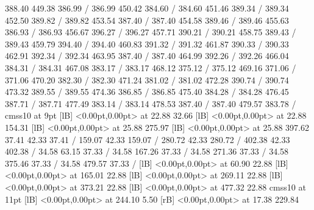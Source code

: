 { 388.40 449.38 386.99 /
 386.99 450.42 384.60 /
 384.60 451.46 389.34 /
 389.34 452.50 389.82 /
 389.82 453.54 387.40 /
 387.40 454.58 389.46 /
 389.46 455.63 386.93 /
 386.93 456.67 396.27 /
 396.27 457.71 390.21 /
 390.21 458.75 389.43 /
 389.43 459.79 394.40 /
 394.40 460.83 391.32 /
 391.32 461.87 390.33 /
 390.33 462.91 392.34 /
 392.34 463.95 387.40 /
 387.40 464.99 392.26 /
 392.26 466.04 384.31 /
 384.31 467.08 383.17 /
 383.17 468.12 375.12 /
 375.12 469.16 371.06 /
 371.06 470.20 382.30 /
 382.30 471.24 381.02 /
 381.02 472.28 390.74 /
 390.74 473.32 389.55 /
 389.55 474.36 386.85 /
 386.85 475.40 384.28 /
 384.28 476.45 387.71 /
 387.71 477.49 383.14 /
 383.14 478.53 387.40 /
 387.40 479.57 383.78 /
\font\picfont cmss10 at 9pt\picfont
{}  [lB] <0.00pt,0.00pt> at 22.88 32.66
  [lB] <0.00pt,0.00pt> at 22.88 154.31
  [lB] <0.00pt,0.00pt> at 25.88 275.97
  [lB] <0.00pt,0.00pt> at 25.88 397.62
\setsolid
{} 37.41 42.33 37.41 /
\setsolid
{} 159.07 42.33 159.07 /
\setsolid
{} 280.72 42.33 280.72 /
\setsolid
{} 402.38 42.33 402.38 /
\setsolid
{} 34.58 63.15 37.33 /
\setsolid
{} 34.58 167.26 37.33 /
\setsolid
{} 34.58 271.36 37.33 /
\setsolid
{} 34.58 375.46 37.33 /
\setsolid
{} 34.58 479.57 37.33 /
  [lB] <0.00pt,0.00pt> at 60.90 22.88
  [lB] <0.00pt,0.00pt> at 165.01 22.88
  [lB] <0.00pt,0.00pt> at 269.11 22.88
  [lB] <0.00pt,0.00pt> at 373.21 22.88
  [lB] <0.00pt,0.00pt> at 477.32 22.88
\font\picfont cmss10 at 11pt\picfont
{}  [lB] <0.00pt,0.00pt> at 244.10 5.50
 [rB] <0.00pt,0.00pt> at 17.38 229.84
\endpicture
}
